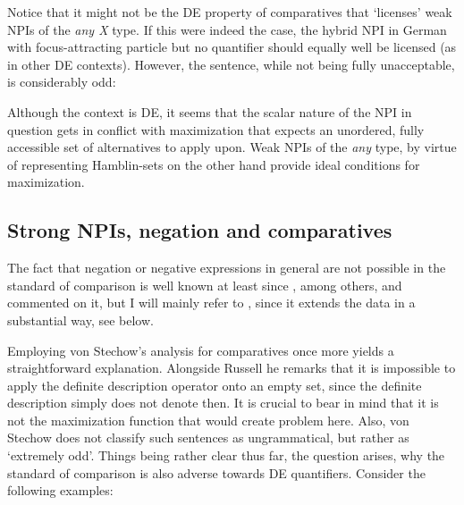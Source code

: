 \documentclass[output=paper,colorlinks,citecolor=brown,
]{langscibook}
\begin{document}
Notice that it might not be the DE property of comparatives that `licenses' weak NPIs of the \textit{any X} type. If this
were indeed the case, the hybrid NPI in German with focus-attracting particle but no quantifier should equally well be
licensed (as in other DE contexts). However, the sentence, while not being fully unacceptable, is considerably odd:


Although the context is DE, it seems that the scalar nature of the NPI in question gets in conflict with maximization
that expects an unordered, fully accessible set of alternatives to apply upon. Weak NPIs of the \textit{any} type, by virtue of
representing Hamblin-sets on the other hand provide ideal conditions for maximization.

\subsection{Strong NPIs, negation and comparatives}

The fact that negation or negative expressions in general are not possible in the standard of comparison is well known
at least since \citet{lees1961}, among others, \citet{ross1980} and \citet{stechow1984} commented on it, but I will
mainly refer to \citet{lechner2002}, since it extends the data in a substantial way, see below.

Employing von Stechow's analysis for comparatives once more yields a straightforward explanation. Alongside Russell he
remarks that it is impossible to apply the definite description operator onto an empty set, since the definite
description simply does not denote then. It is crucial to bear in mind that it is not the maximization function that would create
problem here. Also, von Stechow does not classify such sentences as ungrammatical, but rather as `extremely odd'.
Things being rather clear thus far, the question arises, why the standard of comparison is also adverse towards DE
quantifiers. Consider the following examples:

  \begin{exe}
    \ex
    \begin{xlist}
    \end{xlist}
  \end{exe}
\end{document}
